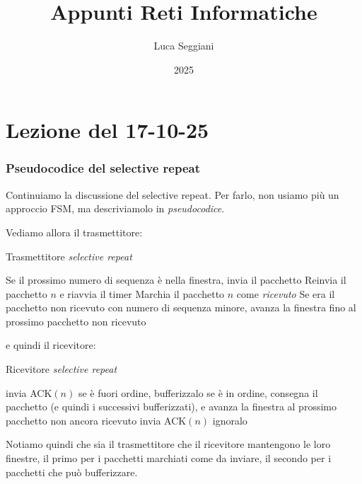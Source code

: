\documentclass[a4paper,11pt]{article}
\title{Appunti Reti Informatiche}
\author{Luca Seggiani}
\date{2025}
\begin{document}
\section{Lezione del 17-10-25}

\thispagestyle{empty}
\pagestyle{fancy}


\subsubsection{Pseudocodice del selective repeat}
Continuiamo la discussione del selective repeat.
Per farlo, non usiamo più un approccio FSM, ma descriviamolo in \textit{pseudocodice}.

Vediamo allora il trasmettitore:
\begin{center}
\begin{algorithm}
	\caption{Trasmettitore \textit{selective repeat}}
\begin{algorithmic}
		\STATE Se il prossimo numero di sequenza è nella finestra, invia il pacchetto
	\ENDIF
		\STATE Reinvia il pacchetto $n$ e riavvia il timer
	\ENDIF
		\STATE Marchia il pacchetto $n$ come \textit{ricevuto}
		\STATE Se era il pacchetto non ricevuto con numero di sequenza minore, avanza la finestra fino al prossimo pacchetto non ricevuto
	\ENDIF
\end{algorithmic}
\end{algorithm}
\end{center}

\newpage

e quindi il ricevitore:
\begin{center}
\begin{algorithm}
	\caption{Ricevitore \textit{selective repeat}}
\begin{algorithmic}
		\STATE invia ACK$(n)$
		\STATE se è fuori ordine, bufferizzalo
		\STATE se è in ordine, consegna il pacchetto (e quindi i successivi bufferizzati), e avanza la finestra al prossimo pacchetto non ancora ricevuto
	\ENDIF
		\STATE invia ACK$(n)$
	\ENDIF
		\STATE ignoralo
	\ENDIF
\end{algorithmic}
\end{algorithm}
\end{center}

Notiamo quindi che sia il trasmettitore che il ricevitore mantengono le loro finestre, il primo per i pacchetti marchiati come da inviare, il secondo per i pacchetti che può bufferizzare.
\end{document}
